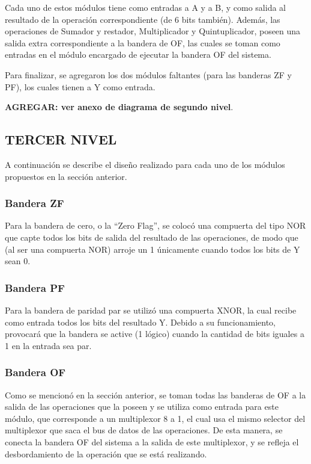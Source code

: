\documentclass[journal,trans]{IEEEtran}
\begin{document}
Cada uno de estos módulos tiene como entradas a A y a B, y como salida al resultado de la operación correspondiente (de 6 bits también). Además, las operaciones de Sumador y restador, Multiplicador y Quintuplicador, poseen una salida extra correspondiente a la bandera de OF, las cuales se toman como entradas en el módulo encargado de ejecutar la bandera OF del sistema.

Para finalizar, se agregaron los dos módulos faltantes (para las banderas ZF y PF), los cuales tienen a Y como entrada.

\textbf{AGREGAR: ver anexo de diagrama de segundo nivel}. 

\subsection{TERCER NIVEL}
A continuación se describe el diseño realizado para cada uno de los módulos propuestos en la sección anterior.

\subsubsection{Bandera ZF}
Para la bandera de cero, o la “Zero Flag”, se colocó una compuerta del tipo NOR que capte todos los bits de salida del resultado de las operaciones, de modo que (al ser una compuerta NOR) arroje un 1 únicamente cuando todos los bits de Y sean 0.

\subsubsection{Bandera PF}
Para la bandera de paridad par se utilizó una compuerta XNOR, la cual recibe como entrada todos los bits del resultado Y. Debido a su funcionamiento, provocará que la bandera se active (1 lógico) cuando la cantidad de bits iguales a 1 en la entrada sea par.

\subsubsection{Bandera OF}
Como se mencionó en la sección anterior, se toman todas las banderas de OF a la salida de las operaciones que la poseen y se utiliza como entrada para este módulo, que corresponde a un multiplexor 8 a 1, el cual usa el mismo selector del multiplexor que saca el bus de datos de las operaciones. De esta manera, se conecta la bandera OF del sistema a la salida de este multiplexor, y se refleja el desbordamiento de la operación que se está realizando. 
\end{document}
